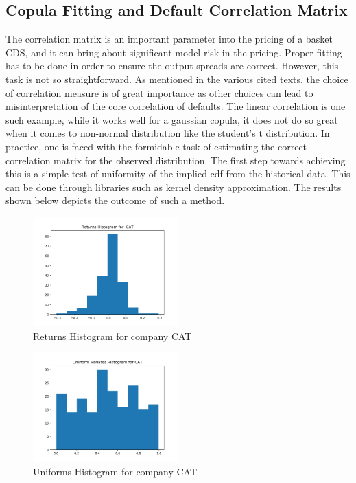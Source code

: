 \documentclass[a4paper,12pt]{article}
\begin{document}
\subsection{Copula Fitting and Default Correlation Matrix}
The correlation matrix is an important parameter into the pricing of a basket CDS, and it can bring about significant model risk in the pricing. Proper fitting has to be done in order to ensure the output spreads are correct. However, this task is not so straightforward. As mentioned in the various cited texts, the choice of correlation measure is of great importance as other choices can lead to misinterpretation of the core correlation of defaults. The linear correlation is one such example, while it works well for a gaussian copula, it does not do so great when it comes to non-normal distribution like the student's t distribution. In practice, one is faced with the formidable task of estimating the correct correlation matrix for the observed distribution. The first step towards achieving this is a simple test of uniformity of the implied cdf from the historical data. This can be done through libraries such as kernel density approximation. The results shown below depicts the outcome of such a method.

\begin{figure}[h]

\centering
\includegraphics[width=0.5\textwidth]{cat_returns_histogram}
\caption{Returns Histogram for company CAT}
\label{image-cat_hist}

\end{figure} 

\begin{figure}[h]

\centering
\includegraphics[width=0.5\textwidth]{cat_uniforms_histogram}
\caption{Uniforms Histogram for company CAT}
\label{image-cat_hist1}

\end{figure} 
\end{document}
